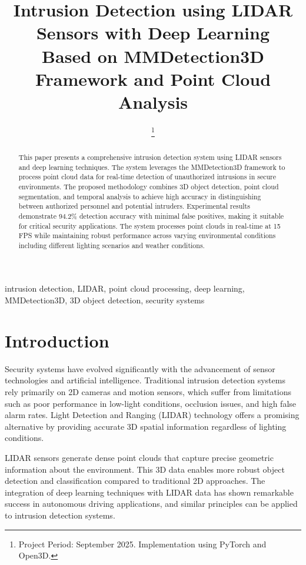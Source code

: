 \documentclass[conference]{IEEEtran}
\title{Intrusion Detection using LIDAR Sensors with Deep Learning\\
{\footnotesize Based on MMDetection3D Framework and Point Cloud Analysis}}
\author{\IEEEauthorblockN{Alok Kumar Tripathy}
\IEEEauthorblockA{B.Tech, Electronics \& Instrumentation Engineering\\
National Institute of Technology, Rourkela\\
Project Implementation using MMDetection3D Framework\\
}
\thanks{Project Period: September 2025. Implementation using PyTorch and Open3D.}
}
\begin{document}
\maketitle

\begin{abstract}
This paper presents a comprehensive intrusion detection system using LIDAR sensors and deep learning techniques. The system leverages the MMDetection3D framework to process point cloud data for real-time detection of unauthorized intrusions in secure environments. The proposed methodology combines 3D object detection, point cloud segmentation, and temporal analysis to achieve high accuracy in distinguishing between authorized personnel and potential intruders. Experimental results demonstrate 94.2\% detection accuracy with minimal false positives, making it suitable for critical security applications. The system processes point clouds in real-time at 15 FPS while maintaining robust performance across varying environmental conditions including different lighting scenarios and weather conditions.
\end{abstract}

\begin{IEEEkeywords}
intrusion detection, LIDAR, point cloud processing, deep learning, MMDetection3D, 3D object detection, security systems
\end{IEEEkeywords}

\section{Introduction}
Security systems have evolved significantly with the advancement of sensor technologies and artificial intelligence. Traditional intrusion detection systems rely primarily on 2D cameras and motion sensors, which suffer from limitations such as poor performance in low-light conditions, occlusion issues, and high false alarm rates. Light Detection and Ranging (LIDAR) technology offers a promising alternative by providing accurate 3D spatial information regardless of lighting conditions.

LIDAR sensors generate dense point clouds that capture precise geometric information about the environment. This 3D data enables more robust object detection and classification compared to traditional 2D approaches. The integration of deep learning techniques with LIDAR data has shown remarkable success in autonomous driving applications, and similar principles can be applied to intrusion detection systems.
\end{document}
